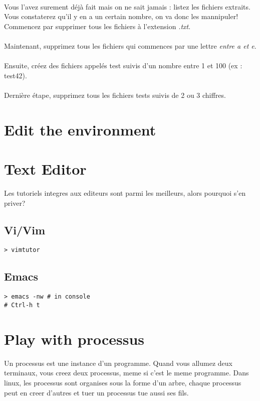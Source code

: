\documentclass[a4paper]{article}
\begin{document}
\paragraph{}Vous l'avez surement déjà fait mais on ne sait jamais : listez les 
fichiers extraits.\\
Vous constaterez qu'il y en a un certain nombre, on va donc les mannipuler!\\
Commencez par supprimer tous les fichiers à l'extension \emph{.txt}.\\
\paragraph{}Maintenant, supprimez tous les fichiers qui commences par une 
lettre \emph{entre a et e}.
\paragraph{}Ensuite, créez des fichiers appelés test suivis d'un nombre entre 
1 et 100 (ex : test42).
\paragraph{}Dernière étape, supprimez tous les fichiers tests suivis de 2 ou 
3 chiffres.


\section{Edit the environment}

\section{Text Editor}
Les tutoriels integres aux editeurs sont parmi les meilleurs, alors pourquoi
s'en priver?
\subsection{Vi/Vim} %
\begin{lstlisting}
> vimtutor
\end{lstlisting}
\subsection{Emacs}
\begin{lstlisting}
> emacs -nw # in console
# Ctrl-h t
\end{lstlisting}

\section{Play with processus}
Un processus est une instance d'un programme. Quand vous allumez deux terminaux,
vous creez deux processus, meme si c'est le meme programme. Dans linux, les
processus sont organises sous la forme d'un arbre, chaque processus peut en
creer d'autres et tuer un processus tue aussi ses fils.
\end{document}
